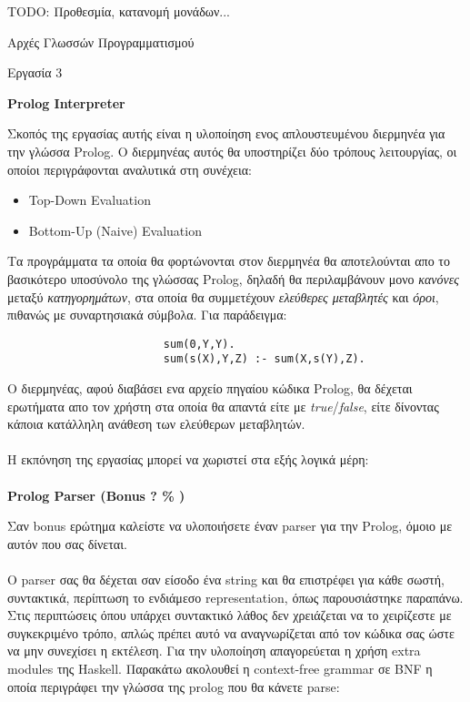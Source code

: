 \documentclass[10pt]{article}
\begin{document}
TODO: Προθεσμία, κατανομή μονάδων...


\begin{center}
    \huge{Αρχές Γλωσσών Προγραμματισμού}

    \LARGE{Εργασία 3}

    \textbf{\Large{Prolog Interpreter}}
\end{center}

\vspace{0.5cm}

Σκοπός της εργασίας αυτής είναι η υλοποίηση ενος απλουστευμένου διερμηνέα για την γλώσσα Prolog. Ο διερμηνέας αυτός θα υποστηρίζει δύο τρόπους λειτουργίας, οι οποίοι περιγράφονται αναλυτικά στη συνέχεια:


\begin{itemize}
    \item Top-Down Evaluation
    \item Bottom-Up (Naive) Evaluation
\end{itemize}


Τα προγράμματα τα οποία θα φορτώνονται στον διερμηνέα θα αποτελούνται απο το βασικότερο υποσύνολο της γλώσσας Prolog, δηλαδή θα περιλαμβάνουν μονο \textit{κανόνες} μεταξύ \textit{κατηγορημάτων}, στα οποία θα συμμετέχουν \textit{ελεύθερες μεταβλητές} και \textit{όροι}, πιθανώς με συναρτησιακά σύμβολα. Για παράδειγμα: 



\begin{verbatim}
                        sum(0,Y,Y).
                        sum(s(X),Y,Z) :- sum(X,s(Y),Z).
\end{verbatim}



Ο διερμηνέας, αφού διαβάσει ενα αρχείο πηγαίου κώδικα Prolog, θα δέχεται ερωτήματα απο τον χρήστη στα οποία θα απαντά είτε με \textit{true}/\textit{false}, είτε δίνοντας κάποια κατάλληλη ανάθεση των ελεύθερων μεταβλητών.\\
\\
Η εκπόνηση της εργασίας μπορεί να χωριστεί στα εξής λογικά μέρη:\\
\\
\textbf{Prolog Parser (Bonus ? \% )}

Σαν bonus ερώτημα καλείστε να υλοποιήσετε έναν parser για την Prolog, όμοιο με αυτόν που σας δίνεται.\\
\\
Ο parser σας θα δέχεται σαν είσοδο ένα string και θα επιστρέφει για κάθε σωστή, συντακτικά, περίπτωση το ενδιάμεσο representation, όπως παρουσιάστηκε παραπάνω. Στις περιπτώσεις όπου υπάρχει συντακτικό λάθος δεν χρειάζεται να το χειρίζεστε με συγκεκριμένο τρόπο, απλώς πρέπει αυτό να αναγνωρίζεται από τον κώδικα σας ώστε να μην συνεχίσει η εκτέλεση. Για την υλοποίηση απαγορεύεται η χρήση extra modules της Haskell. Παρακάτω ακολουθεί η context-free grammar σε BNF η οποία περιγράφει την γλώσσα της prolog που θα κάνετε parse:
\end{document}
